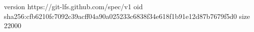 version https://git-lfs.github.com/spec/v1
oid sha256:cfb6210fc7092c39acff04a90a025233c6838f34e618f1b91e12d87b7679f5d0
size 22000
